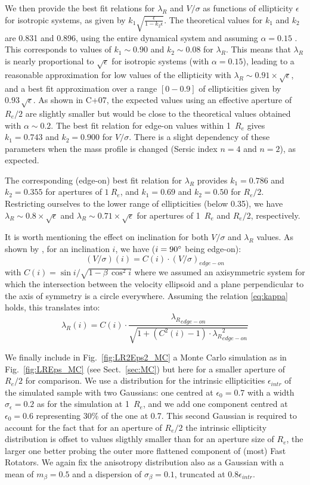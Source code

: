 \documentclass[useAMS,usenatbib,usegraphicx]{mn2e}
\begin{document}
We then provide the best fit relations for $\lambda_R$ and $V/\sigma$ as
functions of ellipticity $\epsilon$ for isotropic systems, as given
by $k_1 \sqrt{\frac{\epsilon}{1 - k_2 \epsilon}}$.
The theoretical values for $k_1$ and $k_2$ are 0.831 and 0.896, using the entire
dynamical system and assuming $\alpha = 0.15$ \citep[see][]{Binney05}. 
This corresponds to values of $k_1 \sim 0.90$ and $k_2 \sim 0.08$ for
$\lambda_R$. This means that $\lambda_R$ is nearly proportional to
$\sqrt{\epsilon}$ for isotropic systems (with $\alpha=0.15$), leading to a reasonable approximation
for low values of the ellipticity with $\lambda_R \sim 0.91 \times \sqrt{\epsilon}$, and a best fit approximation
over a range $[0-0.9]$ of ellipticities given by $0.93 \, \sqrt{\epsilon}$. 
As shown in C+07, the expected values using an effective
aperture of $R_e / 2$ are slightly smaller but would be close to the theoretical
values obtained with $\alpha \sim 0.2$. The best fit relation for edge-on values
within 1~$R_e$ gives $k_1 = 0.743$ and $k_2 = 0.900$ for $V/\sigma$. There is a
slight dependency of these parameters when the mass profile is changed (Sersic
index $n=4$ and $n=2$), as expected. 

The corresponding (edge-on) best fit relation for $\lambda_R$ provides $k_1 = 0.786$ and $k_2 = 0.355$
for apertures of $1~R_e$, and $k_1 = 0.69$ and $k_2 = 0.50$ for $R_e / 2$.
Restricting ourselves to the lower range of ellipticities (below 0.35), we have
$\lambda_R \sim 0.8 \times \sqrt{\epsilon}$ and $\lambda_R \sim 0.71 \times \sqrt{\epsilon}$ for apertures
of 1~$R_e$ and $R_e/2$, respectively. 

It is worth mentioning the effect on inclination for both $V/\sigma$
and $\lambda_R$ values. As shown by \cite{Binney05}, for an inclination $i$, we
have ($i=90\hbox{$^\circ$}$ being edge-on):
$$
\left({V/\sigma}\right)(i) = C(i) \cdot \left({V/\sigma}\right)_{edge-on}
$$
with $C(i) = \sin{i} / \sqrt{1 - \beta\,\cos^2{i}}$ where we assumed an
axisymmetric system for which the intersection between the velocity ellipsoid and a
plane perpendicular to the axis of symmetry is a circle everywhere. Assuming the
relation \ref{eq:kappa} holds, this translates into:
$$
{\lambda_R}(i) = C(i) \cdot \frac{{\lambda_R}_{edge-on} }{\sqrt{1 + (C^2(i)-1)\cdot {\lambda_R}^2_{edge-on}}}
$$

We finally include in Fig.~\ref{fig:LR2Eps2_MC} a Monte Carlo simulation as in Fig.~\ref{fig:LREps_MC}
(see Sect.~\ref{sec:MC}) but here for a smaller aperture of $R_e/2$ for comparison.
We use a distribution for the intrinsic ellipticities $\epsilon_{intr}$ of the simulated sample
with two Gaussians: one centred at $\epsilon_{0} = 0.7$ with a width $\sigma_{\epsilon} = 0.2$ as
for the simulation at 1~$R_e$, and we add one component centred at $\epsilon_0 = 0.6$ 
representing 30\% of the one at 0.7. This second Gaussian is required to account
for the fact that for an aperture of $R_e / 2$ the intrinsic ellipticity distribution
is offset to values sligthly smaller than for an aperture size of $R_e$, the larger one
better probing the outer more flattened component of (most) Fast Rotators.
We again fix the anisotropy distribution also as a Gaussian with a mean of 
$m_{\beta} = 0.5$ and a dispersion of $\sigma_{\beta}
= 0.1$, truncated at $0.8 \epsilon_{intr}$.


\newpage
\clearpage


\end{document}

